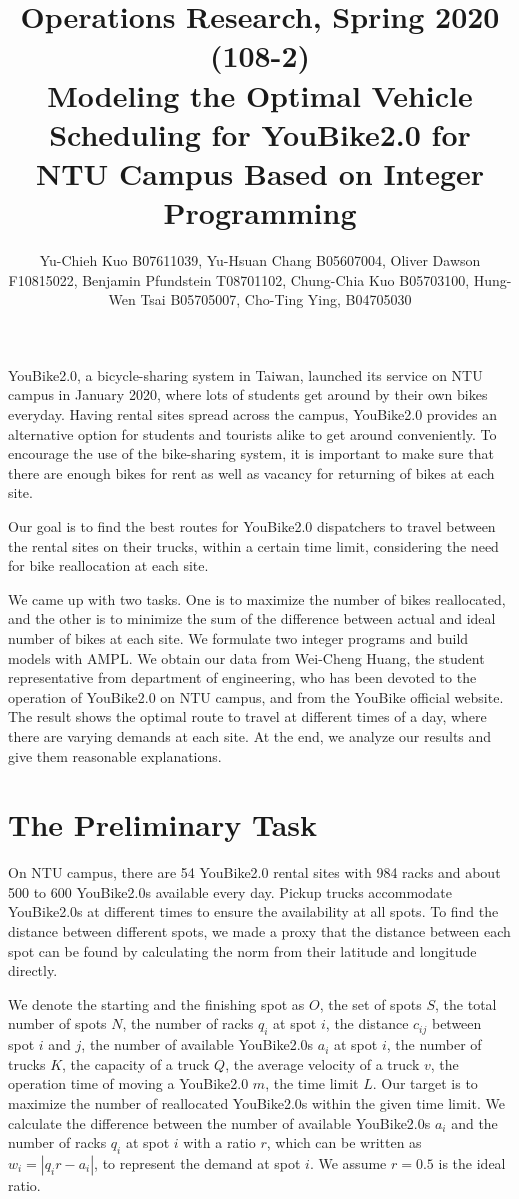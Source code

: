 \documentclass[12pt,a4paper]{article}
\title{Operations Research, Spring 2020 (108-2) \\
Modeling the Optimal Vehicle Scheduling for YouBike2.0 for NTU Campus Based on Integer Programming}
\author{Yu-Chieh Kuo B07611039, Yu-Hsuan Chang B05607004, Oliver Dawson F10815022, Benjamin Pfundstein T08701102, Chung-Chia Kuo B05703100, Hung-Wen Tsai B05705007, Cho-Ting Ying, B04705030}
\date{}
\begin{document}
\maketitle

YouBike2.0, a bicycle-sharing system in Taiwan, launched its service on NTU campus in January 2020, where lots of students get around by their own bikes everyday. Having rental sites spread across the campus, YouBike2.0 provides an alternative option for students and tourists alike to get around conveniently. To encourage the use of the bike-sharing system, it is important to make sure that there are enough bikes for rent as well as vacancy for returning of bikes at each site.

Our goal is to find the best routes for YouBike2.0 dispatchers to travel between the rental sites on their trucks, within a certain time limit, considering the need for bike reallocation at each site.

We came up with two tasks. One is to maximize the number of bikes reallocated, and the other is to minimize the sum of the difference between actual and ideal number of bikes at each site. We formulate two integer programs and build models with AMPL. We obtain our data from Wei-Cheng Huang, the student representative from department of engineering, who has been devoted to the operation of YouBike2.0 on NTU campus, and from the YouBike official website. The result shows the optimal route to travel at different times of a day, where there are varying demands at each site. At the end, we analyze our results and give them reasonable explanations.


\section{The Preliminary Task}
On NTU campus, there are 54 YouBike2.0 rental sites with 984 racks and about 500 to 600 YouBike2.0s available every day. Pickup trucks accommodate YouBike2.0s at different times to ensure the availability at all spots. To find the distance between different spots, we made a proxy that the distance between each spot can be found by calculating the norm from their latitude and longitude directly. 

We denote the starting and the finishing spot as $O$, the set of spots $S$, the total number of spots $N$, the number of racks $q_i$ at spot $i$, the distance $c_{ij}$ between spot $i$ and $j$, the number of available YouBike2.0s $a_i$ at spot $i$, the number of trucks $K$, the capacity of a truck $Q$, the average velocity of a truck $v$, the operation time of moving a YouBike2.0 $m$, the time limit $L$. Our target is to maximize the number of reallocated YouBike2.0s within the given time limit. We calculate the difference between the number of available YouBike2.0s $a_i$ and the number of racks $q_i$ at spot $i$ with a ratio $r$, which can be written as $w_i = |q_ir - a_i|$, to represent the demand at spot $i$. We assume $r=0.5$ is the ideal ratio.
\end{document}
